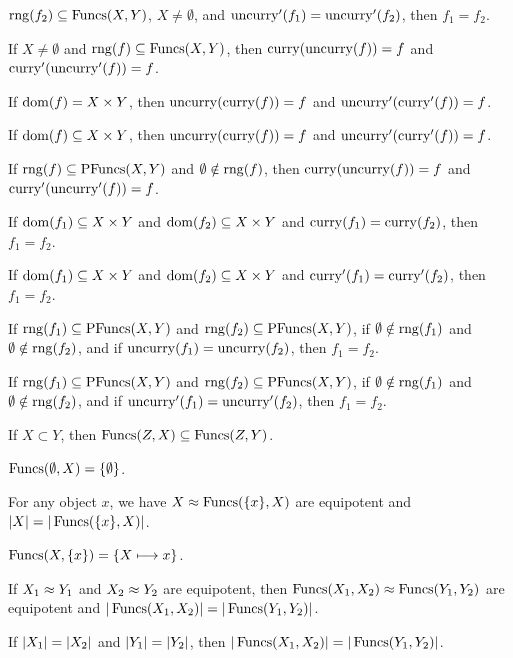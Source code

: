 \documentclass{article}
\begin{document}
\begin{thm}
  $\operatorname{rng}(f_{2})\subseteq\operatorname{Funcs}(X,Y)$, $X\neq\emptyset$, and
  $\operatorname{uncurry}'(f_{1})=\operatorname{uncurry}'(f_{2})$, then $f_{1}=f_{2}$.
\item\label{funct5:48} If $X\neq\emptyset$ and $\operatorname{rng}(f)\subseteq\operatorname{Funcs}(X,Y)$,
  then $\operatorname{curry}(\operatorname{uncurry}(f))=f$ and $\operatorname{curry}'(\operatorname{uncurry}'(f))=f$.
\item\label{funct5:49} If $\operatorname{dom}(f)=X\times Y$, then
  $\operatorname{uncurry}(\operatorname{curry}(f))=f$ and $\operatorname{uncurry}'(\operatorname{curry}'(f))=f$.
\item\label{funct5:50} If $\operatorname{dom}(f)\subseteq X\times Y$, then
  $\operatorname{uncurry}(\operatorname{curry}(f))=f$ and $\operatorname{uncurry}'(\operatorname{curry}'(f))=f$.
\item\label{funct5:51} If $\operatorname{rng}(f)\subseteq\operatorname{PFuncs}(X,Y)$ and
  $\emptyset\notin\operatorname{rng}(f)$, then $\operatorname{curry}(\operatorname{uncurry}(f))=f$ and $\operatorname{curry}'(\operatorname{uncurry}'(f))=f$.
\item\label{funct5:52} If $\operatorname{dom}(f_{1})\subseteq X\times Y$ and
  $\operatorname{dom}(f_{2})\subseteq X\times Y$ and $\operatorname{curry}(f_{1})=\operatorname{curry}(f_{2})$,
  then $f_{1}=f_{2}$.
\item\label{funct5:53} If $\operatorname{dom}(f_{1})\subseteq X\times Y$ and
  $\operatorname{dom}(f_{2})\subseteq X\times Y$ and $\operatorname{curry}'(f_{1})=\operatorname{curry}'(f_{2})$,
  then $f_{1}=f_{2}$.
\item\label{funct5:54} If $\operatorname{rng}(f_{1})\subseteq\operatorname{PFuncs}(X,Y)$ and
  $\operatorname{rng}(f_{2})\subseteq\operatorname{PFuncs}(X,Y)$, if $\emptyset\notin\operatorname{rng}(f_{1})$ and
  $\emptyset\notin\operatorname{rng}(f_{2})$, and if
  $\operatorname{uncurry}(f_{1})=\operatorname{uncurry}(f_{2})$,
  then $f_{1}=f_{2}$.
\item\label{funct5:55} If $\operatorname{rng}(f_{1})\subseteq\operatorname{PFuncs}(X,Y)$ and
  $\operatorname{rng}(f_{2})\subseteq\operatorname{PFuncs}(X,Y)$, if $\emptyset\notin\operatorname{rng}(f_{1})$ and
  $\emptyset\notin\operatorname{rng}(f_{2})$, and if
  $\operatorname{uncurry}'(f_{1})=\operatorname{uncurry}'(f_{2})$,
  then $f_{1}=f_{2}$.
\item\label{funct5:56} If $X\subset Y$, then $\operatorname{Funcs}(Z,X)\subseteq\operatorname{Funcs}(Z,Y)$.
\item\label{funct5:57} $\operatorname{Funcs}(\emptyset,X)=\{\emptyset\}$.
\item\label{funct5:58} For any object $x$, we have
  $X\approx\operatorname{Funcs}(\{x\},X)$ are equipotent and $|X|=|\operatorname{Funcs}(\{x\},X)|$. 
\item\label{funct5:59} $\operatorname{Funcs}(X,\{x\})=\{X\longmapsto x\}$.
\item\label{funct5:60} If $X_{1}\approx Y_{1}$ and $X_{2}\approx Y_{2}$
  are equipotent, then
  $\operatorname{Funcs}(X_{1},X_{2})\approx\operatorname{Funcs}(Y_{1},Y_{2})$ are equipotent and $|\operatorname{Funcs}(X_{1},X_{2})|=|\operatorname{Funcs}(Y_{1},Y_{2})|$.
\item\label{funct5:61} If $|X_{1}|=|X_{2}|$ and
  $|Y_{1}|=|Y_{2}|$, then $|\operatorname{Funcs}(X_{1},X_{2})|=|\operatorname{Funcs}(Y_{1},Y_{2})|$.

\end{thm}
\end{document}
